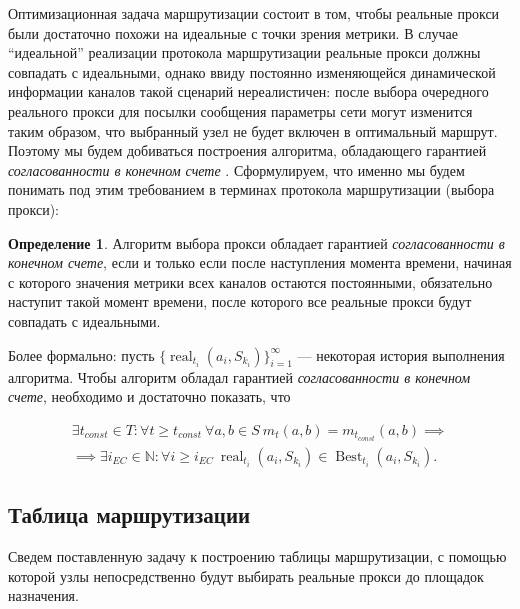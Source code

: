 \documentclass{article}
\theoremstyle{plain}
\theoremstyle{plain}
\theoremstyle{plain}
\theoremstyle{plain}
\theoremstyle{definition}
\newtheorem{definition}{Определение}[section]
\theoremstyle{remark}
\theoremstyle{plain}
\DeclareMathOperator*{\real}{real}
\DeclareMathOperator*{\best}{Best}
\begin{document}
Оптимизационная задача маршрутизации состоит в том, чтобы реальные прокси были достаточно похожи на идеальные с точки зрения метрики. В случае \enquote{идеальной} реализации протокола маршрутизации реальные прокси должны совпадать с идеальными, однако ввиду постоянно изменяющейся динамической информации каналов такой сценарий нереалистичен: после выбора очередного реального прокси для посылки сообщения параметры сети могут изменится таким образом, что выбранный узел не будет включен в оптимальный маршрут. Поэтому мы будем добиваться построения алгоритма, обладающего гарантией \textit{согласованности в конечном счете} \cite{eventual_consistency:10.1145/1435417.1435432}. Сформулируем, что именно мы будем понимать под этим требованием в терминах протокола маршрутизации (выбора прокси):

\begin{definition}
\label{EventualConsistencyDefinition}
    Алгоритм выбора прокси обладает гарантией \textit{согласованности в конечном счете}, если и только если после наступления момента времени, начиная с которого значения метрики всех каналов остаются постоянными, обязательно наступит такой момент времени, после которого все реальные прокси будут совпадать с идеальными.
\end{definition}

Более формально: пусть $\{\real_{t_i}(a_i, S_{k_i})\}_{i = 1}^{\infty}$ --- некоторая история выполнения алгоритма. Чтобы алгоритм обладал гарантией \textit{согласованности в конечном счете}, необходимо и достаточно показать, что 

\begin{equation}
\begin{aligned}
    \exists t_{const} \in T : \forall t \geq t_{const}\ \forall a, b \in S\ m_t(a, b) = m_{t_{const}}(a, b) \implies \\
    \implies \exists i_{EC} \in \mathbb{N} : \forall i \geq i_{EC}\ {\real}_{t_i}(a_i, S_{k_i}) \in {\best}_{t_i}(a_i, S_{k_i}).
\end{aligned}
\end{equation}

\subsection{Таблица маршрутизации}

Сведем поставленную задачу к построению таблицы маршрутизации, с помощью которой узлы непосредственно будут выбирать реальные прокси до площадок назначения.
\end{document}
